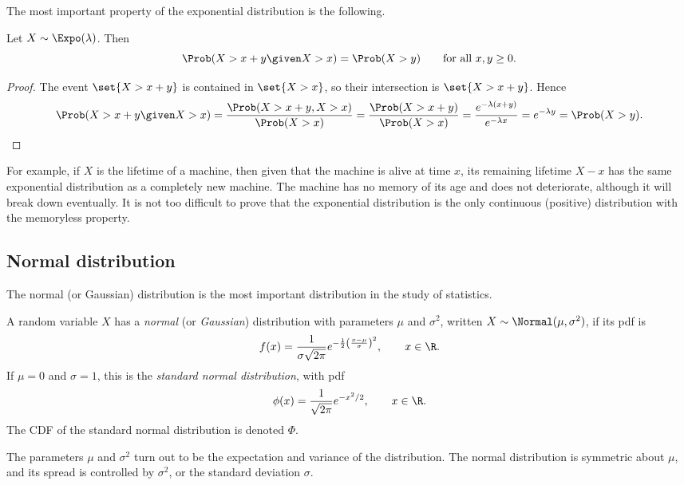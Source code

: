 The most important property of the exponential distribution is the following.

\begin{theorem}\label{thm:exponential-memoryless}
Let $X \sim \Expo(\lambda)$. Then
\[
  \Prob(X > x + y \given X > x) = \Prob(X > y) \qquad \text{for all } x, y \ge 0.
\]
\end{theorem}

\begin{proof}
The event $\set{X > x + y}$ is contained in $\set{X > x}$, so their intersection is $\set{X > x + y}$. Hence
\[
  \Prob(X > x + y \given X > x) = \frac{\Prob(X > x + y, X > x)}{\Prob(X > x)} = \frac{\Prob(X > x + y)}{\Prob(X > x)} = \frac{e^{-\lambda(x+y)}}{e^{-\lambda x}} = e^{-\lambda y} = \Prob(X > y). \qedhere
\]
\end{proof}

For example, if $X$ is the lifetime of a machine, then given that the machine is alive at time $x$, its remaining lifetime $X - x$ has the same exponential distribution as a completely new machine. The machine has no memory of its age and does not deteriorate, although it will break down eventually. It is not too difficult to prove that the exponential distribution is the only continuous (positive) distribution with the memoryless property.

\subsection{Normal distribution}\label{sec:normal}

The normal (or Gaussian) distribution is the most important distribution in the study of statistics.

\begin{definition}\label{def:normal}
A random variable $X$ has a \emph{normal} (or \emph{Gaussian}) distribution with parameters $\mu$ and $\sigma^2$, written $X \sim \Normal(\mu, \sigma^2)$, if its pdf is
\[
  f(x) = \frac{1}{\sigma\sqrt{2\pi}} e^{-\frac12 \left(\frac{x - \mu}{\sigma}\right)^2}, \qquad x \in \R.
\]
If $\mu = 0$ and $\sigma = 1$, this is the \emph{standard normal distribution}, with pdf
\[
  \phi(x) = \frac{1}{\sqrt{2\pi}} e^{-x^2/2}, \qquad x \in \R.
\]
The CDF of the standard normal distribution is denoted $\Phi$.
\end{definition}

The parameters $\mu$ and $\sigma^2$ turn out to be the expectation and variance of the distribution. The normal distribution is symmetric about $\mu$, and its spread is controlled by $\sigma^2$, or the standard deviation $\sigma$.

